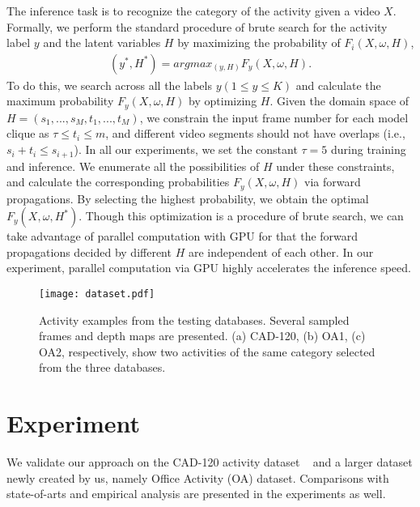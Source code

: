 \documentclass{sig-alternate}
\begin{document}
The inference task is to recognize the category of the activity given a video $X$. Formally, we perform the standard procedure of brute search for the activity label $y$ and the latent variables $H$ by maximizing the probability of $F_i(X,\omega,H)$,
\begin{eqnarray} \label{eq:inference}
(y^{*},H^{*}) = argmax_{(y,H)} F_y(X,\omega,H).
\end{eqnarray}
To do this, we search across all the labels $y(1 \leq y \leq K)$ and calculate the maximum probability $F_y(X,\omega,H)$ by optimizing $H$. Given the domain space of $H=(s_1,...,s_M, t_1,...,t_M)$, we constrain the input frame number for each model clique as $\tau \leq t_i \leq m$, and different video segments should not have overlaps (i.e., $s_i + t_i \leq s_{i+1}$). In all our experiments, we set the constant $\tau= 5$ during training and inference. We enumerate all the possibilities of $H$ under these constraints, and calculate the corresponding probabilities $F_y(X,\omega,H)$ via forward propagations. By selecting the highest probability, we obtain the optimal $F_y(X,\omega,H^{*})$. Though this optimization is a procedure of brute search, we can take advantage of parallel computation with GPU for that the forward propagations decided by different $H$ are independent of each other. In our experiment, parallel computation via GPU highly accelerates the inference speed.

\begin{figure*}[!htb]
\centering
\texttt{[image: dataset.pdf]}
\caption{Activity examples from the testing databases. Several sampled frames and depth maps are presented. (a) CAD-120, (b) OA1, (c) OA2, respectively, show two activities of the same category selected from the three databases.}\label{fig:dataset}
\end{figure*}

\section{Experiment}
\label{sec:exper}
We validate our approach on the CAD-120 activity dataset ~\cite{CADIJRR2013} and a larger dataset newly created by us, namely Office Activity (OA) dataset. Comparisons with state-of-arts and empirical analysis are presented in the experiments as well.
\end{document}

